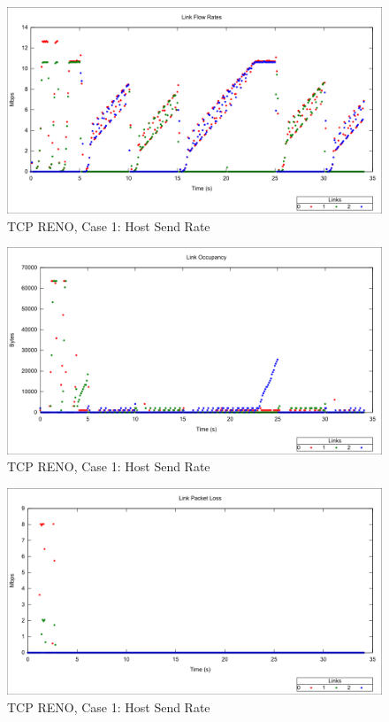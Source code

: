 \begin{figure}[htbp]
    \centering
    \includegraphics[width=\textwidth]{reno1/Link_Flow_Rate.png}
    \caption{TCP RENO, Case 1: Host Send Rate}
\end{figure}

\begin{figure}[htbp]
    \centering
    \includegraphics[width=\textwidth]{reno1/Link_Occupancy.png}
    \caption{TCP RENO, Case 1: Host Send Rate}
\end{figure}

\begin{figure}[htbp]
    \centering
    \includegraphics[width=\textwidth]{reno1/Link_Packet_Loss.png}
    \caption{TCP RENO, Case 1: Host Send Rate}
\end{figure}


